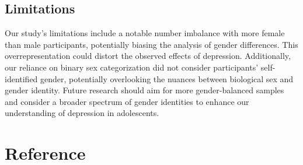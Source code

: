 \documentclass[
  man,floatsintext]{apa6}
\begin{document}
\hypertarget{limitations}{%
\subsection{Limitations}\label{limitations}}

Our study's limitations include a notable number imbalance with more female than male participants, potentially biasing the analysis of gender differences. This overrepresentation could distort the observed effects of depression. Additionally, our reliance on binary sex categorization did not consider participants' self-identified gender, potentially overlooking the nuances between biological sex and gender identity. Future research should aim for more gender-balanced samples and consider a broader spectrum of gender identities to enhance our understanding of depression in adolescents.

\newpage

\hypertarget{reference}{%
\section{Reference}\label{reference}}

\hypertarget{ref}{}
\end{document}
